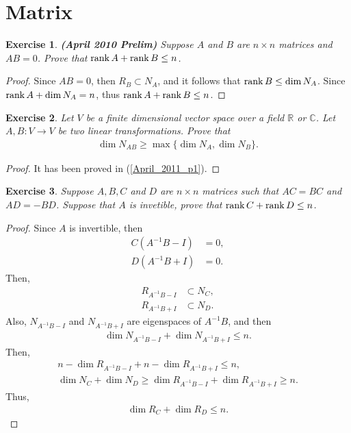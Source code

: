 \documentclass[11pt]{book}
\newtheorem{exercise}{Exercise}[section]
\theoremstyle{definition}
\numberwithin{equation}{subsection}
\begin{document}
\medskip

\section{Matrix}
\begin{exercise}{\bf (April 2010 Prelim)}
Suppose $A$ and $B$ are $n \times n$ matrices and $AB = 0$. Prove that $\rank A + \rank B \leq n$.
\end{exercise}
\begin{proof}
Since $AB = 0$, then $R_B \subset N_A$, and it follows that $\rank B \leq \dim N_A$. Since $\rank A + \dim N_A = n$, thus $\rank A + \rank B \leq n$.
\end{proof}

\medskip

\begin{exercise}
Let $V$ be a finite dimensional vector space over a field $\mathbb{R}$ or $\mathbb{C}$. Let $A, B: V \to V$ be two linear transformations. Prove that
\begin{align*}
    \dim N_{AB} \geq \max\{\dim N_A, \dim N_B\}.
\end{align*}
\end{exercise}
\begin{proof}
It has been proved in (\ref{April_2011_p1}).
\end{proof}

\begin{exercise}
Suppose $A, B, C$ and $D$ are $n \times n$ matrices such that $AC = BC$ and $AD = - BD$. Suppose that $A$ is invetible, prove that $\rank C + \rank D \leq n$.
\end{exercise}
\begin{proof}
Since $A$ is invertible, then
\begin{align*}
    C\left(A^{-1} B - I \right) & = 0, \\
    D\left(A^{-1} B + I \right) & = 0.
\end{align*}
Then, 
\begin{align*}
    R_{A^{-1} B - I} & \subset N_C, \\
    R_{A^{-1} B + I} & \subset N_D.
\end{align*}
Also, $N_{A^{-1} B - I}$ and $N_{A^{-1} B + I}$ are eigenspaces of $A^{-1}B$, and then
\begin{align*}
    \dim N_{A^{-1} B - I} + \dim N_{A^{-1} B + I} \leq n.
\end{align*}
Then, 
\begin{align*}
    n - \dim R_{A^{-1} B - I} + n - \dim R_{A^{-1} B + I} \leq n, \\
    \dim N_C + \dim N_D \geq \dim R_{A^{-1} B - I} + \dim R_{A^{-1} B + I} \geq n.
\end{align*}
Thus, 
\begin{align*}
    \dim R_C + \dim R_D \leq n.
\end{align*}
\end{proof}
\end{document}
